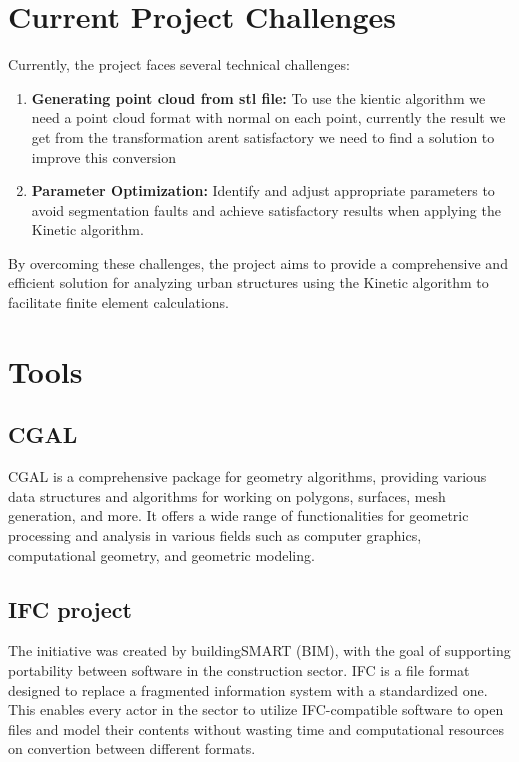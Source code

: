 \documentclass{article}
\begin{document}
\section{Current Project Challenges}

Currently, the project faces several technical challenges:

\begin{enumerate}
    \item \textbf{Generating point cloud from stl file:} To use the kientic algorithm we need a point cloud format with normal on each point, 
    currently the result we get from the transformation arent satisfactory we need to find a solution to improve this conversion
    
    \item \textbf{Parameter Optimization:} Identify and adjust appropriate 
    parameters to avoid segmentation faults and achieve satisfactory results 
    when applying the Kinetic algorithm.
\end{enumerate}

By overcoming these challenges, the project aims to provide a 
comprehensive and efficient solution for analyzing urban structures 
using the Kinetic algorithm to facilitate finite element calculations.\newline

\section{Tools}
\subsection{CGAL}
CGAL is a comprehensive package for geometry algorithms, providing various data structures and algorithms for working on polygons, surfaces, mesh generation, and more.
It offers a wide range of functionalities for geometric processing and analysis in various fields such as computer graphics, computational geometry, and geometric modeling.
\subsection{IFC project}

The initiative was created by buildingSMART (BIM), with the goal of supporting portability between software in the construction sector.
 IFC is a file format designed to replace a fragmented information system with a standardized one.
  This enables every actor in the sector to utilize IFC-compatible software to open files and model their contents without wasting time and computational resources on convertion between different formats.
\end{document}
